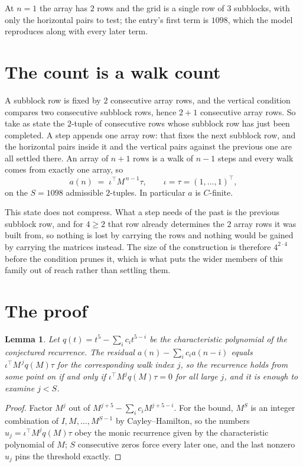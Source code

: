 \documentclass[11pt,a4paper]{article}
\theoremstyle{plain}
\newtheorem{lemma}[theorem]{Lemma}
\theoremstyle{definition}
\begin{document}
At $n=1$ the array has $2$ rows and the grid is a single row of $3$
subblocks, with only the horizontal pairs to test; the entry's first term is
$1098$, which the model reproduces along with every later term.

\section{The count is a walk count}

A subblock row is fixed by $2$ consecutive array rows, and the vertical condition compares
two consecutive subblock rows, hence $2+1$ consecutive array rows. So take as state the
$2$-tuple of consecutive rows whose subblock row has just been completed. A step appends one
array row: that fixes the next subblock row, and the horizontal pairs inside it and the
vertical pairs against the previous one are all settled there. An array of $n+1$ rows is
a walk of $n-1$ steps and every walk comes from exactly one array, so
\[
a(n)\;=\;\iota^{\!\top}M^{\,n-1}\tau,\qquad\iota=\tau=(1,\dots,1)^{\!\top},
\]
on the $S=1098$ admissible $2$-tuples. In particular $a$ is $C$-finite.

This state does not compress. What a step needs of the past is the previous subblock row, and
for $4\ge2$ that row already determines the $2$ array rows it was built from, so nothing
is lost by carrying the rows and nothing would be gained by carrying the matrices instead. The
size of the construction is therefore $4^{2\cdot4}$ before the condition prunes
it, which is what puts the wider members of this family out of reach rather than settling them.

\section{The proof}

\begin{lemma}\label{lem:crit}
Let $q(t)=t^{5}-\sum_i c_it^{5-i}$ be the characteristic polynomial of the
conjectured recurrence. The residual $a(n)-\sum_ic_ia(n-i)$ equals
$\iota^{\!\top}M^{\,j}q(M)\tau$ for the corresponding walk index $j$, so the recurrence
holds from some point on if and only if $\iota^{\!\top}M^{j}q(M)\tau=0$ for all large $j$,
and it is enough to examine $j<S$.
\end{lemma}

\begin{proof}
Factor $M^{j}$ out of $M^{j+5}-\sum_ic_iM^{j+5-i}$. For the bound, $M^{S}$
is an integer combination of $I,M,\dots,M^{S-1}$ by Cayley--Hamilton, so the numbers
$u_j=\iota^{\!\top}M^{j}q(M)\tau$ obey the monic recurrence given by the characteristic
polynomial of $M$; $S$ consecutive zeros force every later one, and the last nonzero $u_j$
pins the threshold exactly.
\end{proof}
\end{document}
